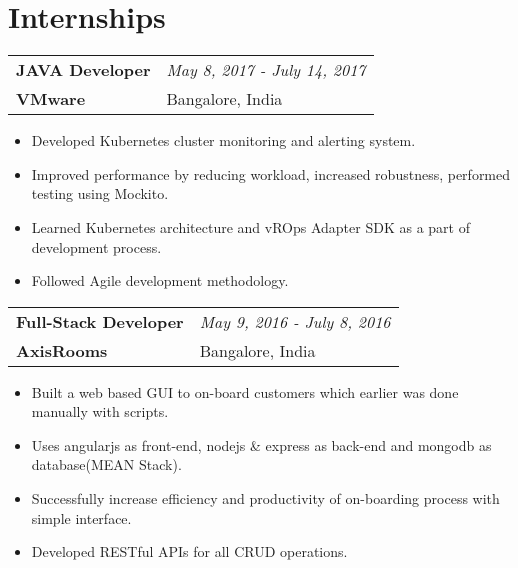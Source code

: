 \documentclass{article}
\begin{document}
\section{Internships}
\begin{tabularx}{\textwidth}{Xl}
	\textbf{JAVA Developer} & \textit{May 8, 2017 - July 14, 2017} \\
	\textbf{VMware} & Bangalore, India
\end{tabularx}
\begin{flushleft}
\begin{itemize}
	\vspace{-2mm} \setlength\itemsep{-0.5em}
	\item Developed Kubernetes cluster monitoring and alerting system.
	\item Improved performance by reducing workload, increased robustness, performed testing using Mockito.
	\item Learned Kubernetes architecture and vROps Adapter SDK as a part of development process.
	\item Followed Agile development methodology.
\end{itemize}
\end{flushleft}
\begin{tabularx}{\textwidth}{Xl}
	\textbf{Full-Stack Developer} & \textit{May 9, 2016 - July 8, 2016} \\
	\textbf{AxisRooms} & Bangalore, India
\end{tabularx}
\begin{flushleft}
\begin{itemize}
	\vspace{-2mm} \setlength\itemsep{-0.5em}
	\item Built a web based GUI to on-board customers which earlier was done manually with scripts.
	\item Uses angularjs as front-end, nodejs \& express as back-end and mongodb as database(MEAN Stack).
	\item Successfully increase efficiency and productivity of on-boarding process with simple interface.
	\item Developed RESTful APIs for all CRUD operations.
\end{itemize}
\end{flushleft}
\vspace{-2mm}
\end{document}
